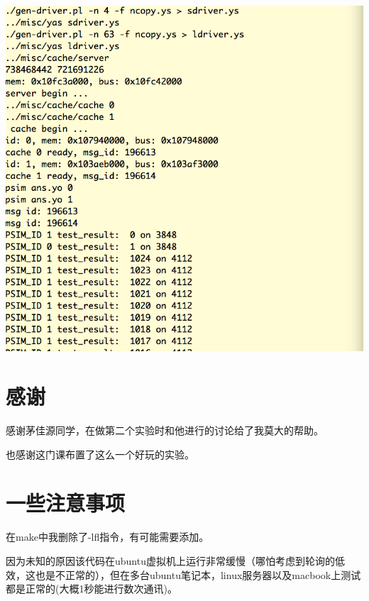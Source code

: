 \documentclass{article}
\theoremstyle{plain} \newtheorem{theorem}{常识}[section]
\theoremstyle{plain} \newtheorem{lizi}{例}[section]
\begin{document}
\includegraphics[scale=0.3]{1.png}
\section{感谢}
感谢茅佳源同学，在做第二个实验时和他进行的讨论给了我莫大的帮助。

也感谢这门课布置了这么一个好玩的实验。

\section{一些注意事项}
在make中我删除了-lfl指令，有可能需要添加。

因为未知的原因该代码在ubuntu虚拟机上运行非常缓慢（哪怕考虑到轮询的低效，这也是不正常的），但在多台ubuntu笔记本，linux服务器以及macbook上测试都是正常的(大概1秒能进行数次通讯)。
\end{document}
